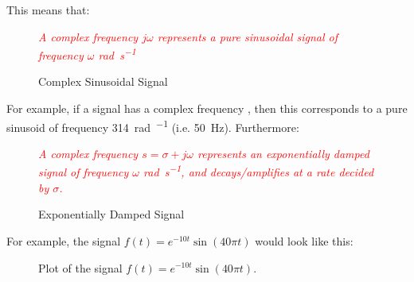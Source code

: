 \documentclass[../notes-main.tex]{subfiles}
\begin{document}
\noindent This means that:
\begin{figure}[H]
    \centering
    \begin{mdframed}
        \begin{center}
            \textcolor{red}{\emph{A complex frequency \(j\omega \) represents a pure sinusoidal signal of frequency \(\omega \) \unit{\radian\per\second}}}
        \end{center}
    \end{mdframed}\label{fig:complex-sinusoid-def-1}
    \vspace{-1em}\caption{Complex Sinusoidal Signal}
\end{figure}
\vspace{-1em}
\noindent For example, if a signal has a complex frequency  , then this corresponds to a pure sinusoid of frequency \SI{314}{\radian\per\sec} (i.e. \SI{50}{\hertz}). Furthermore:
\begin{figure}[H]
    \centering
    \begin{mdframed}
        \begin{center}
            \textcolor{red}{%
                \emph{A complex frequency \(s = \sigma + j\omega \) represents an exponentially
                    damped signal of frequency \(\omega \) \unit{\radian\per\second}, and decays/amplifies at a rate decided by \(\sigma \).}}
        \end{center}
    \end{mdframed}\label{fig:exp-damped-sinusoid-def-1}
    \vspace{-1em}\caption{Exponentially Damped Signal}
\end{figure}
\vspace{-1em}
\noindent For example, the signal \(f(t) = e^{- 10t}\sin(40\pi t) \) would look like this:
\begin{figure}[H]
    \centering
    \vspace{-1em}\caption{Plot of the signal \(f(t) = e^{- 10t}\sin(40\pi t)\).}\label{fig:exp-damped-sinusoid-plot-1}
\end{figure}
\vspace{-1em}
\end{document}
